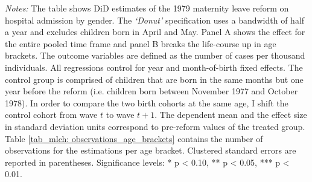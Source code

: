 \begin{landscape}
\begin{table}[H]
\begin{threeparttable}
{\begin{tabular}{l*{12}{c}}
 		\end{tabular}}
 		\begin{tablenotes} 
 			\item \scriptsize \emph{Notes:} The table shows DiD estimates of the 1979 maternity leave reform on hospital admission by gender. The \textit{`Donut'} specification uses a bandwidth of half a year and excludes children born in April and May. Panel A shows the effect for the entire pooled time frame and panel B breaks the life-course up in age brackets. The outcome variables are defined as the number of cases per thousand individuals. All regressions control for year and month-of-birth fixed effects. The control group is comprised of children that are born in the same months but one year before the reform (i.e. children born between November 1977 and October 1978). In order to compare the two birth cohorts at the same age, I shift the control cohort from wave $t$ to wave $t+1$. The dependent mean and the effect size in standard deviation units correspond to pre-reform values of the treated group. Table \ref{tab_mlch: observations_age_brackets} contains the number of observations for the estimations per age bracket. Clustered standard errors are reported in parentheses. \newline Significance levels: * p < 0.10, ** p < 0.05, *** p < 0.01. \newline 	%
 		\end{tablenotes} 
 	\end{threeparttable} 
 \end{table}
\vspace*{\fill}\clearpage 
\end{landscape}

% 
